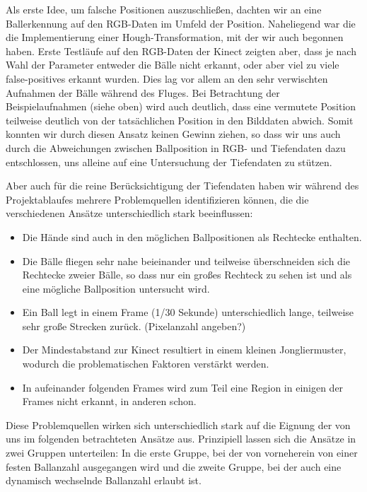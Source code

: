 \documentclass[12pt,a4paper,ngerman]{scrartcl}
\begin{document}
Als erste Idee, um falsche Positionen auszuschließen, dachten wir an eine
Ballerkennung auf den RGB-Daten im Umfeld der Position. Naheliegend war die die
Implementierung einer Hough-Transformation, mit der wir auch begonnen haben.
Erste Testläufe auf den RGB-Daten der Kinect zeigten aber, dass je nach Wahl der
Parameter entweder die Bälle nicht erkannt, oder aber viel zu viele false-positives
erkannt wurden. Dies lag vor allem an den sehr verwischten Aufnahmen der Bälle
während des Fluges. Bei Betrachtung der Beispielaufnahmen (siehe oben) wird auch
deutlich, dass eine vermutete Position teilweise deutlich von der tatsächlichen
Position in den Bilddaten abwich. Somit konnten wir durch diesen Ansatz keinen Gewinn
ziehen, so dass wir uns auch durch die Abweichungen zwischen Ballposition in RGB- und
Tiefendaten dazu entschlossen, uns alleine auf eine Untersuchung der Tiefendaten zu
stützen.

Aber auch für die reine Berücksichtigung der Tiefendaten haben wir während des
Projektablaufes mehrere Problemquellen identifizieren können, die die verschiedenen
Ansätze unterschiedlich stark beeinflussen:

\begin{itemize}
 \item Die Hände sind auch in den möglichen Ballpositionen als Rechtecke enthalten.
 \item Die Bälle fliegen sehr nahe beieinander und teilweise überschneiden sich die Rechtecke zweier Bälle, so dass nur ein großes Rechteck zu sehen ist und als eine mögliche Ballposition untersucht wird.
 \item Ein Ball legt in einem Frame (1/30 Sekunde) unterschiedlich lange, teilweise sehr große Strecken zurück. (Pixelanzahl angeben?)
 \item Der Mindestabstand zur Kinect resultiert in einem kleinen Jongliermuster, wodurch die problematischen Faktoren verstärkt werden.
 \item In aufeinander folgenden Frames wird zum Teil eine Region in einigen der Frames nicht erkannt, in anderen schon.
\end{itemize}

Diese Problemquellen wirken sich unterschiedlich stark auf die Eignung der von
uns im folgenden betrachteten Ansätze aus. Prinzipiell lassen sich die Ansätze
in zwei Gruppen unterteilen: In die erste Gruppe, bei der von vorneherein von einer
festen Ballanzahl ausgegangen wird und die zweite Gruppe, bei der auch eine dynamisch wechselnde Ballanzahl erlaubt ist.
\end{document}
